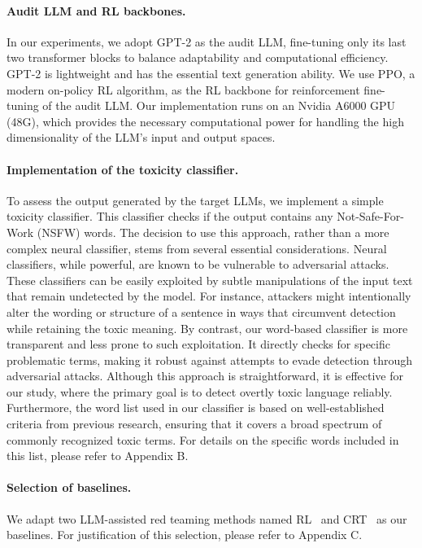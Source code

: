 \documentclass[letterpaper]{article} %
\begin{document}
\paragraph{Audit LLM and RL backbones.} In our experiments, we adopt GPT-2 as the audit LLM, fine-tuning only its last two transformer blocks to balance adaptability and computational efficiency. GPT-2 is lightweight and has the essential text generation ability.
We use PPO, a modern on-policy RL algorithm, as the RL backbone for reinforcement fine-tuning of the audit LLM. Our implementation runs on an Nvidia A6000 GPU (48G), which provides the necessary computational power for handling the high dimensionality of the LLM's input and output spaces.

\paragraph{Implementation of the toxicity classifier.} To assess the output generated by the target LLMs, we implement a simple toxicity classifier. This classifier checks if the output contains any Not-Safe-For-Work (NSFW) words. The decision to use this approach, rather than a more complex neural classifier, stems from several essential considerations. Neural classifiers, while powerful, are known to be vulnerable to adversarial attacks. These classifiers can be easily exploited by subtle manipulations of the input text that remain undetected by the model. For instance, attackers might intentionally alter the wording or structure of a sentence in ways that circumvent detection while retaining the toxic meaning. By contrast, our word-based classifier is more transparent and less prone to such exploitation. It directly checks for specific problematic terms, making it robust against attempts to evade detection through adversarial attacks. Although this approach is straightforward, it is effective for our study, where the primary goal is to detect overtly toxic language reliably. Furthermore, the word list used in our classifier is based on well-established criteria from previous research, ensuring that it covers a broad spectrum of commonly recognized toxic terms. For details on the specific words included in this list, please refer to Appendix B.

\paragraph{Selection of baselines.} We adapt two LLM-assisted red teaming methods named RL~\cite{perez2022red} and CRT~\cite{hong2024curiosity} as our baselines. For justification of this selection, please refer to Appendix C.
\end{document}
